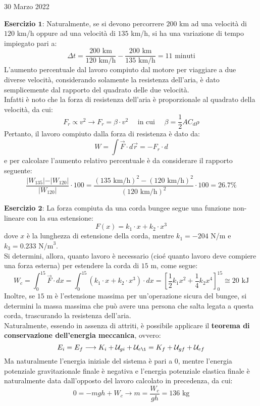 \documentclass[a4paper]{extarticle}
\begin{document}
\newpage
\noindent
\begin{center}
  30 Marzo 2022
\end{center}
\textbf{Esercizio $\boldsymbol{1}$}: Naturalmente, se si devono percorrere $200$ km ad una velocità di $120$ km/h oppure ad una velocità di $135$ km/h, si ha una variazione di tempo impiegato pari a:
\[\Delta t = \frac{200 \text{ km}}{120 \text{ km/h}} - \frac{200 \text{ km}}{135 \text{ km/h}} = 11 \text{ minuti}\]
L'aumento percentuale dal lavoro compiuto dal motore per viaggiare a due diverse velocità, considerando solamente la resistenza dell'aria, è dato semplicemente dal rapporto del quadrato delle due velocità.\\
Infatti è noto che la forza di resistenza dell'aria è proporzionale al quadrato della velocità, da cui:
\[F_r \propto v^2 \longrightarrow F_r = \beta \cdot v^2 \hspace{1em} \text{ in cui } \hspace{1em} \beta=\frac{1}{2}AC_d\rho\]
Pertanto, il lavoro compiuto dalla forza di resistenza è dato da:
\[W = \int \vec F \cdot d \vec r = - F_r \cdot d\]
e per calcolare l'aumento relativo percentuale è da considerare il rapporto seguente:
\[\frac{\vert W_{135} \vert - \vert W_{120} \vert}{\vert W_{120} \vert} \cdot 100 = \frac{(135 \text{ km/h})^2 - (120 \text{ km/h})^2}{(120 \text{ km/h})^2} \cdot 100 = 26.7 \%\]

\vspace{1em}
\noindent
\textbf{Esercizio $\boldsymbol{2}$}: La forza compiuta da una corda bungee segue una funzione non-lineare con la sua estensione:
\[F(x) = k_1 \cdot x + k_2 \cdot x^3\]
dove $x$ è la lunghezza di estensione della corda, mentre $k_1=-204$ N/m e $k_3 = 0.233 \text{ N/m}^3$.\\
Si determini, allora, quanto lavoro è necessario (cioé quanto lavoro deve compiere una forza esterna) per estendere la corda di $15$ m, come segue:
\[W_{c} = \int_0^{15} \vec F \cdot d x =  \int_0^{15} \left(k_1 \cdot x + k_2 \cdot x^3 \right) \cdot d x = \left[\frac{1}{2}k_1x^2 + \frac{1}{4}k_2 x^4 \right]_0^15 \cong 20 \text{ kJ}\]
Inoltre, se $15$ m è l'estensione massima per un'operazione sicura del bungee, si determini la massa massima che può avere una persona che salta legata a questa corda, trascurando la resistenza dell'aria.\\
Naturalmente, essendo in assenza di attriti, è possibile applicare il \textbf{teorema di conservazione dell'energia meccanica}, ovvero:
\[E_i = E_f \longrightarrow K_i + \mathcal{U}_{gi} + \mathcal{U}_{e\i} = K_f + \mathcal{U}_{gf} + \mathcal{U}_{ef}\]
Ma naturalmente l'energia iniziale del sistema è pari a $0$, mentre l'energia potenziale gravitazionale finale è negativa e l'energia potenziale elastica finale è naturalmente data dall'opposto del lavoro calcolato in precedenza, da cui:
\[0 = -mgh + W_c \longrightarrow m = \frac{W_c}{gh} = 136 \text{ kg}\]
\end{document}

